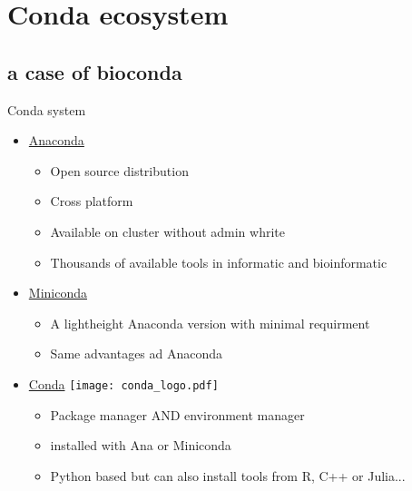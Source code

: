 \section{Conda ecosystem}
\subsection{a case of bioconda}

\begin{frame}{Conda system}
\begin{itemize}
\item<1-3> \hyperlink{https://www.anaconda.com/}{Anaconda}
	\begin{itemize}
	\item Open source distribution
    \item Cross platform
    \item Available on cluster without admin whrite
    \item Thousands of available tools in informatic and bioinformatic
	\end{itemize}
\item<2-3> \hyperlink{https://docs.conda.io/en/latest/miniconda.html}{Miniconda}
	\begin{itemize}
	\item A lightheight Anaconda version with minimal requirment
	\item Same advantages ad Anaconda
	\end{itemize}
\item<3> \hyperlink{https://docs.conda.io/projects/conda/en/latest/index.html}{Conda} \texttt{[image: conda\_logo.pdf]} 
	\begin{itemize}[<4->]
	\item Package manager AND environment manager
	\item installed with Ana or Miniconda
	\item Python based but can also install tools from R, C++ or Julia...
	\end{itemize}
\end{itemize}
\end{frame}

